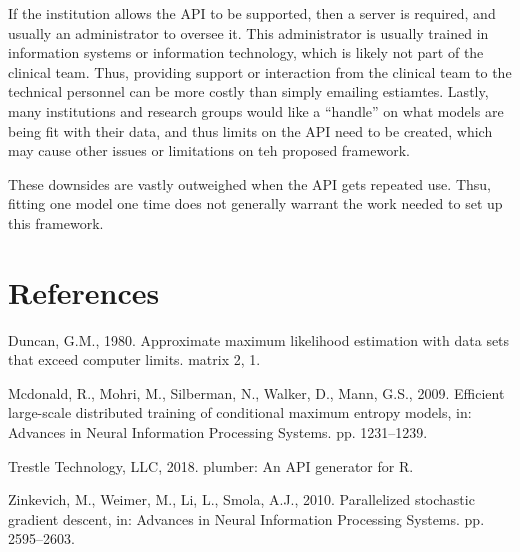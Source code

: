 \documentclass[]{elsarticle} %
\begin{document}
If the institution allows the API to be supported, then a server is
required, and usually an administrator to oversee it. This administrator
is usually trained in information systems or information technology,
which is likely not part of the clinical team. Thus, providing support
or interaction from the clinical team to the technical personnel can be
more costly than simply emailing estiamtes. Lastly, many institutions
and research groups would like a ``handle'' on what models are being fit
with their data, and thus limits on the API need to be created, which
may cause other issues or limitations on teh proposed framework.

These downsides are vastly outweighed when the API gets repeated use.
Thsu, fitting one model one time does not generally warrant the work
needed to set up this framework.

\hypertarget{references}{%
\section*{References}\label{references}}

\hypertarget{refs}{}
\leavevmode\hypertarget{ref-duncan1980approximate}{}%
Duncan, G.M., 1980. Approximate maximum likelihood estimation with data
sets that exceed computer limits. matrix 2, 1.

\leavevmode\hypertarget{ref-mcdonald2009efficient}{}%
Mcdonald, R., Mohri, M., Silberman, N., Walker, D., Mann, G.S., 2009.
Efficient large-scale distributed training of conditional maximum
entropy models, in: Advances in Neural Information Processing Systems.
pp. 1231--1239.

\leavevmode\hypertarget{ref-plumber}{}%
Trestle Technology, LLC, 2018. plumber: An API generator for R.

\leavevmode\hypertarget{ref-zinkevich2010parallelized}{}%
Zinkevich, M., Weimer, M., Li, L., Smola, A.J., 2010. Parallelized
stochastic gradient descent, in: Advances in Neural Information
Processing Systems. pp. 2595--2603.
\end{document}
